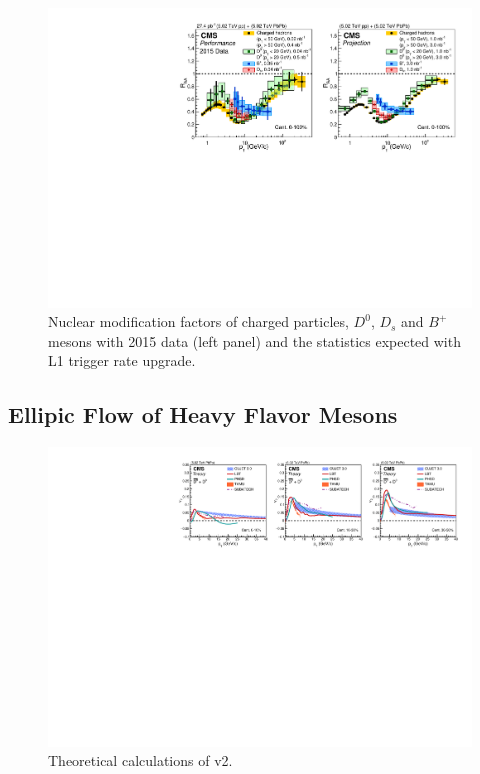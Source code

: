 \begin{figure}[!ht]
\begin{center}
\includegraphics[width=.90\textwidth]{figures/cRAA_lumiTG_3_lumiMB_1_v2.pdf}
\caption{Nuclear modification factors of charged particles, $D^0$, $D_s$ and $B^+$ mesons with 2015 data (left panel) and the statistics expected with L1 trigger rate upgrade.}
\label{fig:RAA_2015}
\end{center}
\end{figure}

\subsection{Ellipic Flow of Heavy Flavor Mesons}


\begin{figure}[!ht]
\begin{center}
\includegraphics[width=.90\textwidth]{figures/cTheoryV2_D_v1.pdf}
\caption{Theoretical calculations of v2.}
\label{fig:aj_2015}
\end{center}
\end{figure}

